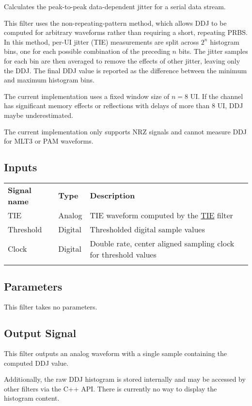 Calculates the peak-to-peak data-dependent jitter for a serial data stream.

This filter uses the non-repeating-pattern method, which allows DDJ to be computed for arbitrary waveforms rather than
requiring a short, repeating PRBS. In this method, per-UI jitter (TIE) measurements are split across $2^n$ histogram
bins, one for each possible combination of the preceding $n$ bits. The jitter samples for each bin are then averaged to
remove the effects of other jitter, leaving only the DDJ.  The final DDJ value is reported as the difference between
the minimum and maximum histogram bins.

The current implementation uses a fixed window size of $n=8$ UI. If the channel has significant memory effects or
reflections with delays of more than 8 UI, DDJ maybe underestimated.

The current implementation only supports NRZ signals and cannot measure DDJ for MLT3 or PAM waveforms.

\subsection{Inputs}

\begin{tabularx}{16cm}{llX}
\thickhline
\textbf{Signal name} & \textbf{Type} & \textbf{Description} \\
\thickhline
TIE & Analog & TIE waveform computed by the \hyperref[filter:tie]{TIE} filter\\
\thinhline
Threshold & Digital & Thresholded digital sample values\\
\thinhline
Clock & Digital & Double rate, center aligned sampling clock for threshold values\\
\thickhline
\end{tabularx}

\subsection{Parameters}

This filter takes no parameters.

\subsection{Output Signal}

This filter outputs an analog waveform with a single sample containing the computed DDJ value.

Additionally, the raw DDJ histogram is stored internally and may be accessed by other filters via the C++ API. There is
currently no way to display the histogram content.

